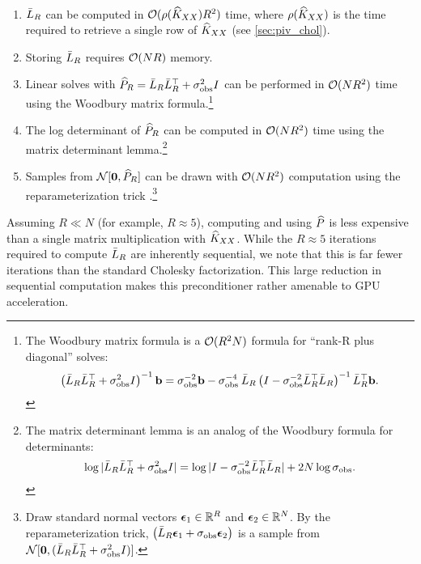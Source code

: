 \begin{observation}
  {\ }
  \begin{enumerate}
    \item $\bar{L}_{R}$ can be computed in $\bigo{\row{\trainK}R^{2}}$ time, where $\rho ( \widehat{K}_{XX} )$ is the time required to retrieve a single row of $\widehat{K}_{XX}$
      (see \cref{sec:piv_chol}).

    \item Storing $\bar{L}_{R}$ requires $\bigo{NR}$ memory.

    \item Linear solves with $\widehat{P}_R = \bar{L}_{R} \bar{L}_{R}^{\top} + \sigma_\text{obs}^{2} I$ can be performed in $\bigo{NR^{2}}$ time using the Woodbury matrix formula.\footnote{
      The Woodbury matrix formula is a $\bigo{R^2 N}$ formula for ``rank-R plus diagonal'' solves:
      $$\left( \bar{L}_{R} \bar{L}_{R}^{\top} + \sigma^{2}_\text{obs} I \right)^{-1} \mathbf{b} = {\sigma_\text{obs}^{-2}}\mathbf{b} - {\sigma_\text{obs}^{-4}} \: \bar{L}_{R} \left( I - {\sigma^{-2}_\text{obs}} \bar{L}_{R}^{\top} \bar{L}_{R} \right)^{-1} \bar{L}_{R}^{\top}\mathbf{b}.$$
    }

    \item The log determinant of $\widehat{P}_R$ can be computed in $\bigo{NR^{2}}$ time using the matrix determinant lemma.\footnote{
      The matrix determinant lemma is an analog of the Woodbury formula for determinants:
      $$\log \vert \bar{L}_{R} \bar{L}_{R}^\top + \sigma^{2}_\text{obs} I \vert = \log \vert I - {\sigma_\text{obs}^{-2}} \bar{L}_{R}^{\top} \bar{L}_{R} \vert + 2 N \log \sigma_\text{obs}.$$
    }

  \item Samples from $\normaldist{ \bzero}{ \trainP_R }$ can be drawn with $\bigo{NR^2}$ computation using the reparameterization trick \cite{kingma2014auto}.\footnote{
      Draw standard normal vectors $\boldsymbol{\epsilon}_1 \in \mathbb{R}^R$ and $\boldsymbol{\epsilon}_2 \in \mathbb{R}^N$.
      By the reparameterization trick, $\left( \bar{L}_R \boldsymbol{\epsilon}_1 + \sigma_\text{obs} \boldsymbol{\epsilon}_2 \right)$ is a sample from $\normaldist{ \bzero}{( \bar\bL_R \bar\bL_R^\top + \sigma^2_\text{obs} \bI )}$.
    }
  \end{enumerate}
\end{observation}
%
\noindent
Assuming $R \ll N$ (for example, $R \approx 5$), computing and using $\widehat{P}$ is less expensive than a single matrix multiplication with $\widehat{K}_{XX}$.
While the $R \approx 5$ iterations required to compute $\bar{L}_R$ are inherently sequential, we note that this is far fewer iterations than the standard Cholesky factorization.
This large reduction in sequential computation makes this preconditioner rather amenable to GPU acceleration.

